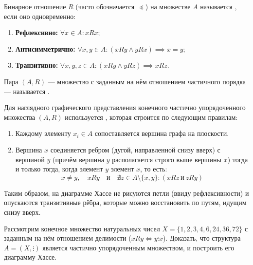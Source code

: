 \begin{definition}
    Бинарное отношение $R$ (часто обозначается $\preceq$) на множестве $A$ 
    называется , если оно 
    одновременно:
    \begin{enumerate}
        \item \textbf{Рефлексивно:} $\forall x \in A : x R x$;
        \item \textbf{Антисимметрично:} 
        $\forall x, y \in A : (x R y \land y R x) \implies x = y$;
        \item \textbf{Транзитивно:} 
        $\forall x, y, z \in A : (x R y \land y R z) \implies x R z$.
    \end{enumerate}
    Пара $(A, R)$ — множество с заданным на нём отношением частичного 
    порядка — называется .
\end{definition}

\begin{definition}
    Для наглядного графического представления конечного частично 
    упорядоченного множества $(A, R)$ используется , 
    которая строится по следующим правилам:
    \begin{enumerate}
        \item Каждому элементу $x_i \in A$ сопоставляется вершина графа 
        на плоскости.
        \item Вершина $x$ соединяется ребром (дугой, направленной снизу 
        вверх) с вершиной $y$ (причём вершина $y$ располагается строго 
        выше вершины $x$) тогда и только тогда, когда элемент $y$ 
         элемент $x$, то есть:
        \begin{equation} \label{eq:hasse_cover}
            x \neq y, \quad x R y \quad \text{и} \quad 
            \nexists z \in A \setminus \{x, y\} : (x R z \ \text{и} \ z R y) 
            \tag{11}
        \end{equation}
    \end{enumerate}
    Таким образом, на диаграмме Хассе не рисуются петли (ввиду 
    рефлексивности) и опускаются транзитивные рёбра, которые можно 
    восстановить по путям, идущим снизу вверх.
\end{definition}

\begin{problem}
    Рассмотрим конечное множество натуральных чисел 
    $X = \{1, 2, 3, 4, 6, 24, 36, 72\}$ с заданным на нём отношением 
    делимости ($x R y \iff y \vdots x$). Доказать, что структура 
    $A = (X, \vdots)$ является частично упорядоченным множеством, и 
    построить его диаграмму Хассе.
\end{problem}

